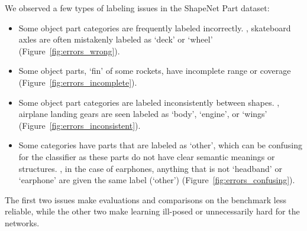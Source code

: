 \documentclass[10pt,twocolumn,letterpaper]{article}
\newcommand{\vjcomment}[1]{{\bf \textcolor{red}{VJ: #1}}}
\begin{document}
We observed a few types of labeling issues in the ShapeNet Part dataset: 
\begin{itemize}
\vspace{-0.1cm}
\item Some object part categories are frequently labeled incorrectly. 
\Eg, skateboard axles are often mistakenly labeled as `deck' or `wheel' (Figure~\ref{fig:errors_wrong}). 
\vspace{-0.1cm}
\item Some object parts, \eg `fin' of some rockets, have incomplete range or coverage 
(Figure~\ref{fig:errors_incomplete}).
\vspace{-0.1cm}
\item Some object part categories are labeled inconsistently between shapes. \Eg, airplane landing gears 
are seen labeled as `body', `engine', or `wings' (Figure~\ref{fig:errors_inconsistent}). 
\vspace{-0.1cm}
\item Some categories have 
parts that are labeled as `other', which can be confusing for the classifier as these parts do not have
clear semantic meanings or structures. \Eg, in the case of earphones,
anything that is not `headband' or `earphone' are given the same label 
(`other')
(Figure~\ref{fig:errors_confusing}). 
\end{itemize}

The first two issues make evaluations and comparisons on the benchmark less reliable, while the other two  make 
learning ill-posed or unnecessarily hard for the networks. 
\end{document}
